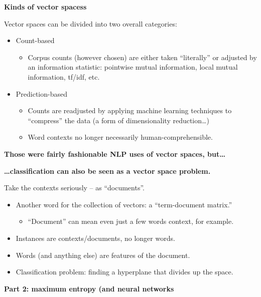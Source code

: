 \documentclass{beamer}
\newcommand{\placard}[1]{
  \begin{frame}
    \begin{center}
      \huge
      \textbf{#1}
    \end{center}
  \end{frame}
}
\newcommand{\pagestepalt}[2]{
  \begin{frame}[t]
    \begin{minipage}[t][0.26\textheight][t]{\textwidth}
      \begin{center}
        \huge
        \textbf{#1}
      \end{center}
    \end{minipage}
    
    \begin{minipage}[t][0.7\textheight][c]{\textwidth}
      #2
    \end{minipage}
  \end{frame}
}
\begin{document}
\pagestepalt{Kinds of vector spacess}{
  Vector spaces can be divided into two overall categories:\pause
  \begin{itemize}
  \item Count-based
    \begin{itemize}
    \item Corpus counts (however chosen) are either taken ``literally'' or adjusted by an
      information statistic: pointwise mutual information, local mutual information,
      tf/idf, etc. 
    \end{itemize}\pause
  \item Prediction-based 
    \begin{itemize}
    \item Counts are readjusted by applying machine learning techniques to ``compress'' 
      the data (a form of dimensionality reduction\ldots)
    \item Word contexts no longer necessarily human-comprehensible.
    \end{itemize}
  \end{itemize}
}


\placard{Those were fairly fashionable NLP uses of vector spaces, but\ldots}

\pagestepalt{\ldots classification can also be seen as a vector space problem.}{
  Take the contexts seriously -- as ``documents''.\pause
  \begin{itemize}
  \item Another word for the collection of vectors: a ``term-document matrix.''\pause
    \begin{itemize}
    \item ``Document'' can mean even just a few words context, for example.\pause
    \end{itemize}
  \item Instances are contexts/documents, no longer words.\pause
  \item Words (and anything else) are features of the document.\pause
  \item Classification problem: finding a \alert{hyperplane} that divides up the space.
  \end{itemize}
}

\placard{Part 2: maximum entropy (and neural networks}
\end{document}
